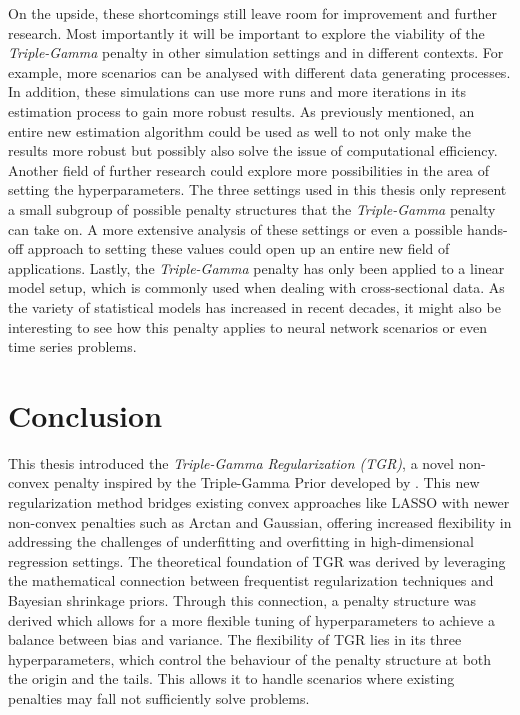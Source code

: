 \documentclass[12pt,a4paper]{article}
\begin{document}
On the upside, these shortcomings still leave room for improvement and further research. Most importantly it will be important to explore the viability of the \textit{Triple-Gamma} penalty in other simulation settings and in different contexts. For example, more scenarios can be analysed with different data generating processes. In addition, these simulations can use more runs and more iterations in its estimation process to gain more robust results. As previously mentioned, an entire new estimation algorithm could be used as well to not only make the results more robust but possibly also solve the issue of computational efficiency. Another field of further research could explore more possibilities in the area of setting the hyperparameters. The three settings used in this thesis only represent a small subgroup of possible penalty structures that the \textit{Triple-Gamma} penalty can take on. A more extensive analysis of these settings or even a possible hands-off approach to setting these values could open up an entire new field of applications. Lastly, the \textit{Triple-Gamma} penalty has only been applied to a linear model setup, which is commonly used when dealing with cross-sectional data. As the variety of statistical models has increased in recent decades, it might also be interesting to see how this penalty applies to neural network scenarios or even time series problems.

\section{Conclusion}

This thesis introduced the \textit{Triple-Gamma Regularization (TGR)}, a novel non-convex penalty inspired by the Triple-Gamma Prior developed by \textcite{TGP2020}. This new regularization method bridges existing convex approaches like LASSO with newer non-convex penalties such as Arctan and Gaussian, offering increased flexibility in addressing the challenges of underfitting and overfitting in high-dimensional regression settings. The theoretical foundation of TGR was derived by leveraging the mathematical connection between frequentist regularization techniques and Bayesian shrinkage priors. Through this connection, a penalty structure was derived which allows for a more flexible tuning of hyperparameters to achieve a balance between bias and variance. The flexibility of TGR lies in its three hyperparameters, which control the behaviour of the penalty structure at both the origin and the tails. This allows it to handle scenarios where existing penalties may fall not sufficiently solve problems.\\
\end{document}
